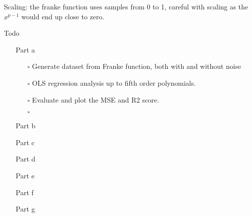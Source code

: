 Scaling: the franke function uses samples from 0 to 1, careful with scaling as the $x^{p-1}$ would end up close to zero. 

Todo
\begin{itemize}
    \item[Part a] 
    \begin{itemize}
        \item[$\square$] Generate dataset from Franke function, both with and without noise
        \item[$\square$] OLS regression analysis up to fifth order polynomials.
        \item[$\square$] Evaluate and plot the MSE and R2 score.
        \item[$\square$]
    \end{itemize}

    \item[Part b]

    \item[Part c]

    \item[Part d]

    \item[Part e]

    \item[Part f]

    \item[Part g]
\end{itemize}